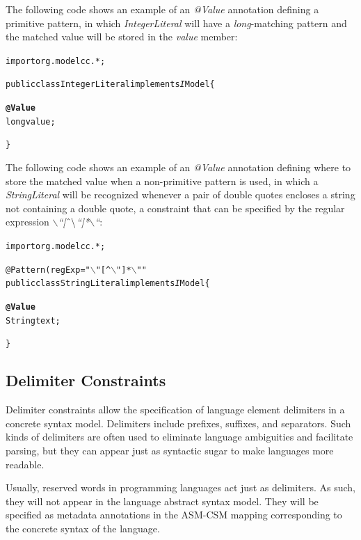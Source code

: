\documentclass[a4paper,twoside,onecolumn]{article}
\newenvironment{colframe}{%
  \begin{Sbox} 
    \begin{minipage}{.8\columnwidth} 
}{%

  \end{minipage} 
  \end{Sbox} 
  \begin{center} 
    \fcolorbox{black}{MyGray}{\TheSbox} 
  \end{center} 
}
\newcommand{\an}[1]{\emph{#1}} %
\begin{document}
The following code shows an example of an \an{@Value} annotation defining a primitive pattern, in which \emph{IntegerLiteral} will have a \emph{long}-matching pattern and the matched value will be stored in the \emph{value} member:

\begin{colframe}
\begin{alltt}
import org.modelcc.*;

public class IntegerLiteral implements{\emph IModel} \{

  {\bf\unskip @Value}
  long value;

\}
\end{alltt}
\end{colframe}

The following code shows an example of an \an{@Value} annotation defining where to store the matched value when a non-primitive pattern is used, in which a \emph{StringLiteral} will be recognized whenever a pair of double quotes
encloses a string not containing a double quote, a constraint that can be specified by the regular expression \emph{$\backslash$``[$\mathbin{\char`\^}\backslash$``]*$\backslash$``}:

\begin{colframe}
\begin{alltt}
import org.modelcc.*;

@Pattern(regExp="\(\backslash\)"[^\(\backslash\)"]*\(\backslash\)""
public class StringLiteral implements{\emph IModel} \{

  {\bf\unskip @Value} 
  String text;

\}
\end{alltt}
\end{colframe}


\subsection{Delimiter Constraints}

Delimiter constraints allow the specification of language element delimiters in a concrete syntax model. Delimiters include prefixes, suffixes,
and separators. Such kinds of delimiters are often used to eliminate language ambiguities and facilitate parsing, but they can appear just as
syntactic sugar to make languages more readable.

Usually, reserved words in programming languages act just as delimiters. As such, they will not appear in the language abstract syntax model.
They will be specified as metadata annotations in the ASM-CSM mapping corresponding to the concrete syntax of the language.
\end{document}

